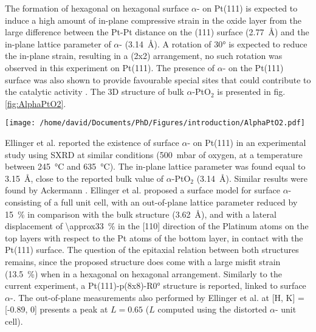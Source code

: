 The formation of hexagonal on hexagonal surface $\alpha$- on Pt(111) is expected to induce a high amount of in-plane compressive strain in the oxide layer from the large difference between the Pt-Pt distance on the (111) surface (\qty{2.77}{\angstrom}) and the in-plane lattice parameter of $\alpha$- (\qty{3.14}{\angstrom}).
A rotation of \ang{30} is expected to reduce the in-plane strain, resulting in a (2x2) arrangement, no such rotation was observed in this experiment on Pt(111).
The presence of $\alpha$- on the Pt(111) surface was also shown to provide favourable special sites that could contribute to the catalytic activity \parencite{Li2005}.
The 3D structure of bulk $\alpha$-PtO$_2$ is presented in fig. \ref{fig:AlphaPtO2}.

\begin{SCfigure}
    \centering
    \texttt{[image: /home/david/Documents/PhD/Figures/introduction/AlphaPtO2.pdf]}
    \caption{
        $\alpha$- bulk unit cell.
        Platinum atoms are situated on the unit cell corners while the two oxygen atoms are at the positions $(1/3, 2/3, 1/4)$ and $(2/3, 1/3, 3/4)$.
    }
    \label{fig:AlphaPtO2}
\end{SCfigure}

Ellinger et al. \parencite*{Ellinger2008} reported the existence of surface $\alpha$- on Pt(111) in an experimental study using SXRD at similar conditions (\qty{500}{\milli\bar} of oxygen, at a temperature between \qty{245}{\degreeCelsius} and \qty{635}{\degreeCelsius}).
The in-plane lattice parameter was found equal to \qty{3.15}{\angstrom}, close to the reported bulk value of $\alpha$-PtO$_2$ (\qty{3.14}{\angstrom}).
Similar results were found by Ackermann \parencite*{Ackermann2007}.
Ellinger et al. \parencite*{Ellinger2008} proposed a surface model for surface $\alpha$- consisting of a full unit cell, with an out-of-plane lattice parameter reduced by \qty{15}{\percent} in comparison with the bulk structure (\qty{3.62}{\angstrom}), and with a lateral displacement of \qty{\approx33}{\percent} in the [110] direction of the Platinum atoms on the top layers with respect to the Pt atoms of the bottom layer, in contact with the Pt(111) surface.
The question of the epitaxial relation between both structures remains, since the proposed structure does come with a large misfit strain (\qty{13.5}{\percent}) when in a hexagonal on hexagonal arrangement.
Similarly to the current experiment, a Pt(111)-p(8x8)-R\ang{0} structure is reported, linked to surface $\alpha$-.
The out-of-plane measurements also performed by Ellinger et al. \parencite*{Ellinger2008} at [H, K] = [-0.89, 0] presents a peak at $L=0.65$ ($L$ computed using the distorted $\alpha$- unit cell).

